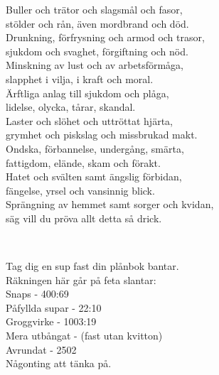 \songtext{}Buller och trätor och slagsmål och fasor,\\
stölder och rån, även mordbrand och död.\\
Drunkning, förfrysning och armod och trasor,\\
sjukdom och svaghet, förgiftning och nöd.\\
Minskning av lust och av arbetsförmåga,\\
slapphet i vilja, i kraft och moral.\\
Ärftliga anlag till sjukdom och plåga,\\
lidelse, olycka, tårar, skandal.\\
Laster och slöhet och uttröttat hjärta,\\
grymhet och piskslag och missbrukad makt.\\
Ondska, förbannelse, undergång, smärta,\\
fattigdom, elände, skam och förakt.\\
Hatet och svälten samt ängslig förbidan,\\
fängelse, yrsel och vansinnig blick.\\
Sprängning av hemmet samt sorger och kvidan,\\
säg vill du pröva allt detta så drick.\\

\newpage 


 \\       

\songtext{}Tag dig en sup fast din plånbok bantar.\\
Räkningen här går på feta slantar:\\
Snaps - 400:69\\
Påfyllda supar - 22:10\\
Groggvirke - 1003:19\\
Mera utbångat - (fast utan kvitton)\\
Avrundat - 2502\\
Någonting att tänka på.\\
